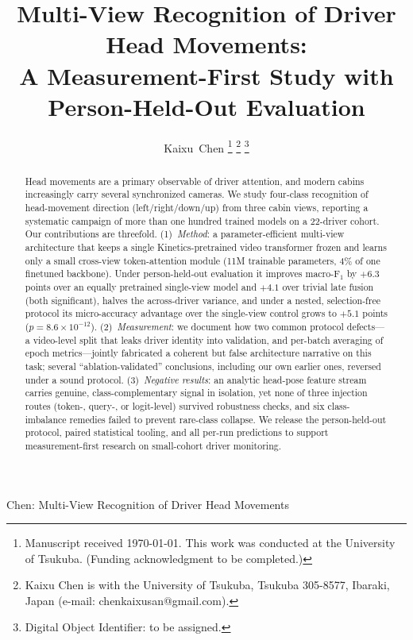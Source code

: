 \documentclass[journal]{IEEEtran}
\newcommand{\micro}{micro-accuracy}
\newcommand{\mF}{macro-F$_1$}
\begin{document}
\title{Multi-View Recognition of Driver Head Movements:\\
A Measurement-First Study with Person-Held-Out Evaluation}

\author{Kaixu~Chen%
\thanks{Manuscript received \today.  This work was conducted at the
University of Tsukuba.  (Funding acknowledgment to be completed.)}%
\thanks{Kaixu Chen is with the University of Tsukuba, Tsukuba 305-8577,
Ibaraki, Japan (e-mail: chenkaixusan@gmail.com).}%
\thanks{Digital Object Identifier: to be assigned.}}

%
{Chen: Multi-View Recognition of Driver Head Movements}

\maketitle

\begin{abstract}
Head movements are a primary observable of driver attention, and modern
cabins increasingly carry several synchronized cameras.  We study four-class
recognition of head-movement direction (left/right/down/up) from three cabin
views, reporting a systematic campaign of more than one hundred trained
models on a 22-driver cohort.  Our contributions are threefold.
(1)~\emph{Method}: a parameter-efficient multi-view architecture that keeps a
single Kinetics-pretrained video transformer frozen and learns only a small
cross-view token-attention module (11M trainable parameters, 4\% of one
finetuned backbone).  Under person-held-out evaluation it improves \mF{} by
$+6.3$ points over an equally pretrained single-view model and $+4.1$ over
trivial late fusion (both significant), halves the across-driver variance,
and under a nested, selection-free protocol its \micro{} advantage over the
single-view control grows to $+5.1$ points ($p{=}8.6\times10^{-12}$).
(2)~\emph{Measurement}: we document how two common protocol defects---a
video-level split that leaks driver identity into validation, and per-batch
averaging of epoch metrics---jointly fabricated a coherent but false
architecture narrative on this task; several ``ablation-validated''
conclusions, including our own earlier ones, reversed under a sound protocol.
(3)~\emph{Negative results}: an analytic head-pose feature stream carries
genuine, class-complementary signal in isolation, yet none of three injection
routes (token-, query-, or logit-level) survived robustness checks, and six
class-imbalance remedies failed to prevent rare-class collapse.  We release
the person-held-out protocol, paired statistical tooling, and all per-run
predictions to support measurement-first research on small-cohort driver
monitoring.
\end{abstract}
\end{document}
